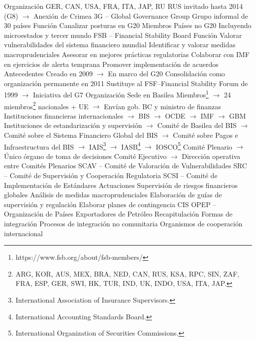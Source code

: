 \documentclass{nuevotema}
\begin{document}
\begin{esquemal}
				\4 Organización
				\4[] GER, CAN, USA, FRA, ITA, JAP, RU
				\4[] RUS invitado hasta 2014 (G8)
				\4[] $\to$ Anexión de Crimea
			\3 3G -- Global Governance Group
				\4 Grupo informal de 30 países
				\4 Función
				\4[] Canalizar posturas en G20
				\4 Miembros
				\4[] Países no G20
				\4[] Incluyendo microestados y tercer mundo
			\3 FSB -- Financial Stability Board
				\4 Función
				\4[] Valorar vulnerabilidades del sistema financiero mundial
				\4[] Identificar y valorar medidas macroprudenciales
				\4[] Asesorar en mejores prácticas regulatorias
				\4[] Colaborar con IMF en ejercicios de alerta temprana
				\4[] Promover implementación de acuerdos
				\4 Antecedentes
				\4[] Creado en 2009
				\4[] $\to$ En marco del G20
				\4[] Consolidación como organización permanente en 2011
				\4[] Sustituye al FSF--Financial Stability Forum de 1999
				\4[] $\to$ Iniciativa del G7
				\4 Organización
				\4[] Sede en Basilea
				\4[] Miembros\footnote{https://www.fsb.org/about/fsb-members/}
				\4[] $\to$ 24 miembros\footnote{ARG, KOR, AUS, MEX, BRA, NED, CAN, RUS, KSA, RPC, SIN, ZAF, FRA, ESP, GER, SWI, HK, TUR, IND, UK, INDO, USA, ITA, JAP.} nacionales + UE
				\4[] $\to$ Envían gob. BC y ministro de finanzas
				\4[] Instituciones financieras internacionales
				\4[] $\to$ BIS
				\4[] $\to$ OCDE
				\4[] $\to$ IMF
				\4[] $\to$ GBM
				\4[] Instituciones de estandarización y supervisión
				\4[] $\to$ Comité de Basilea del BIS
				\4[] $\to$ Comité sobre el Sistema Financiero Global del BIS
				\4[] $\to$ Comité sobre Pagos e Infraestructura del BIS
				\4[] $\to$ IAIS\footnote{International Association of Insurance Supervisors.}
				\4[] $\to$ IASB\footnote{International Accounting Standards Board.}
				\4[] $\to$ IOSCO\footnote{International Organization of Securities Commissions.}
				\4[] Comité Plenario
				\4[] $\to$ Único órgano de toma de decisiones
				\4[] Comité Ejecutivo
				\4[] $\to$ Dirección operativa entre Comités Plenarios
				\4[] SCAV -- Comité de Valoración de Vulnerabilidades
				\4[] SRC -- Comité de Supervisión y Cooperación Regulatoria
				\4[] SCSI -- Comité de Implementación de Estándares
				\4 Actuaciones
				\4[] Supervisión de riesgos financieros globales
				\4[] Análisis de medidas macroprudenciales
				\4[] Elaboración de guías de supervisión y regulación
				\4[] Elaborar planes de contingencia
			\3 CIS
			\3 OPEP -- Organización de Países Exportadores de Petróleo
	\1[] 
		\2 Recapitulación
			\3 Formas de integración
			\3 Procesos de integración no comunitaria
			\3 Organismos de cooperación internacional

\end{esquemal}
\end{document}
